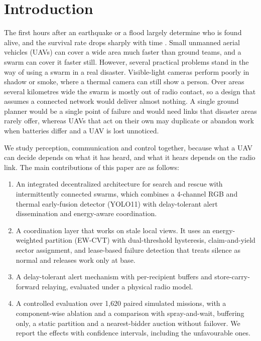 \documentclass[conference]{IEEEtran}
\begin{document}
\section{Introduction}
The first hours after an earthquake or a flood largely determine who is found alive, and the survival rate drops sharply with time \cite{speth2022}. Small unmanned aerial vehicles (UAVs) can cover a wide area much faster than ground teams, and a swarm can cover it faster still. However, several practical problems stand in the way of using a swarm in a real disaster. Visible-light cameras perform poorly in shadow or smoke, where a thermal camera can still show a person. Over areas several kilometres wide the swarm is mostly out of radio contact, so a design that assumes a connected network would deliver almost nothing. A single ground planner would be a single point of failure and would need links that disaster areas rarely offer, whereas UAVs that act on their own may duplicate or abandon work when batteries differ and a UAV is lost unnoticed.

We study perception, communication and control together, because what a UAV can decide depends on what it has heard, and what it hears depends on the radio link. The main contributions of this paper are as follows:
\begin{enumerate}
\item An integrated decentralized architecture for search and rescue with intermittently connected swarms, which combines a 4-channel RGB and thermal early-fusion detector (YOLO11) with delay-tolerant alert dissemination and energy-aware coordination.
\item A coordination layer that works on stale local views. It uses an energy-weighted partition (EW-CVT) with dual-threshold hysteresis, claim-and-yield sector assignment, and lease-based failure detection that treats silence as normal and releases work only at base.
\item A delay-tolerant alert mechanism with per-recipient buffers and store-carry-forward relaying, evaluated under a physical radio model.
\item A controlled evaluation over 1{,}620 paired simulated missions, with a component-wise ablation and a comparison with spray-and-wait, buffering only, a static partition and a nearest-bidder auction without failover. We report the effects with confidence intervals, including the unfavourable ones.
\end{enumerate}
\end{document}

